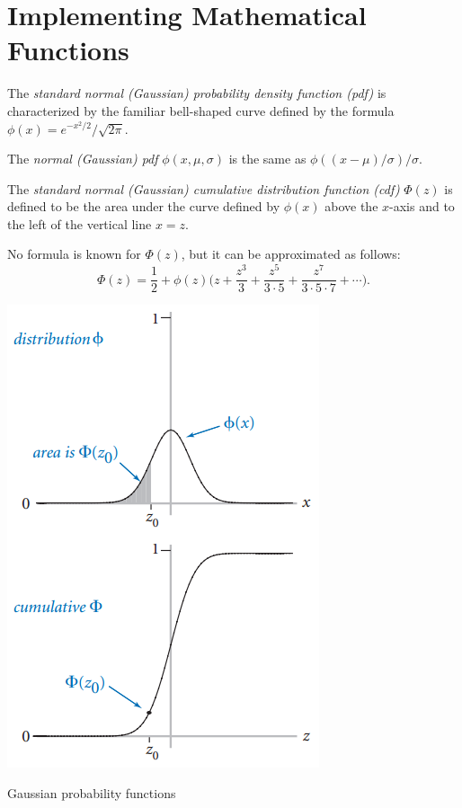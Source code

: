 \documentclass[8pt,a4paper,compress,handout]{beamer}
\begin{document}
\section{Implementing Mathematical Functions}

\begin{frame}[fragile]
\begin{minipage}{200pt}
The \emph{standard normal (Gaussian) probability density function (pdf)} is characterized by the familiar bell-shaped curve defined by the formula $\phi(x)=e^{-x^2/2}/\sqrt{2\pi}$.

\bigskip

The \emph{normal (Gaussian) pdf} $\phi(x, \mu, \sigma)$ is the same as $\phi((x-\mu)/\sigma)/\sigma$. 

\bigskip

The \emph{standard normal (Gaussian) cumulative distribution function (cdf)} $\Phi(z)$ is defined to be the area under the curve defined by $\phi(x)$ above the $x$-axis and to the left of the vertical line $x=z$. 

\bigskip

No formula is known for $\Phi(z)$, but it can be approximated as follows: $$\Phi(z)=\frac{1}{2}+\phi(z)\big(z+\frac{z^3}{3}+\frac{z^5}{3\cdot 5}+\frac{z^7}{3\cdot 5\cdot 7}+\cdots\big ).$$
\end{minipage}\hfill%
\begin{minipage}{100pt}
\begin{center}
\includegraphics[scale=0.25]{figures/gaussian.png}

\smallskip

\tiny

Gaussian probability functions
\end{center}
\end{minipage}
\end{frame}
\end{document}
